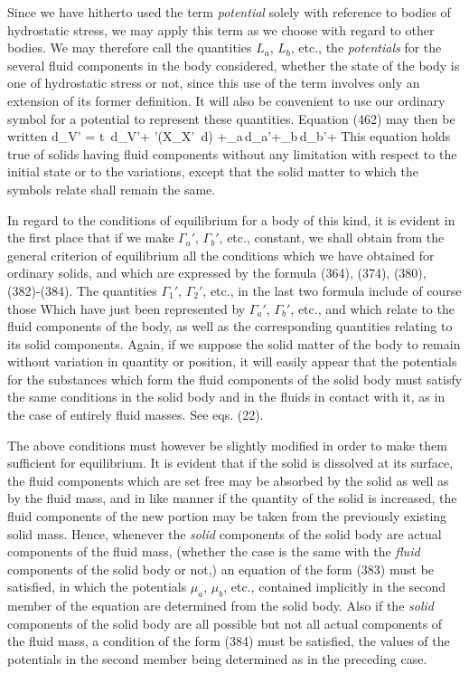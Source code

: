 \documentclass[12pt]{article}
\begin{document}
{Since we have hitherto used the term \textit{potential} solely with reference to bodies of hydrostatic stress, we may apply this term as we choose with regard to other bodies. We may therefore call the quantities $L_a$, $L_b$, etc., the \textit{potentials} for the several fluid components in the body considered, whether the state of the body is one of hydrostatic stress or not, since this use of the term involves only an extension of its former definition. It will also be convenient to use our ordinary symbol for a potential to represent these quantities. Equation (462) may then be written
\eqs d\epsilon_{V'} = t \,d\eta_{V'}+  \sum\sum\nolimits'\left(X_{X'} \,d\right) +\mu_a\,d\Gamma_a'+\mu_b\,d\Gamma_b'+     \label{468}\eqe
This equation holds true of solids having fluid components without any limitation with respect to the initial state or to the variations, except that the solid matter to which the symbols relate shall remain the same.


In regard to the conditions of equilibrium for a body of this kind, it is evident in the first place that if we make $\Gamma_a'$, $\Gamma_b'$, etc., constant, we shall obtain from the general criterion of equilibrium all the conditions which we have obtained for ordinary solids, and which are expressed by the formula (364), (374), (380), (382)-(384). The quantities $\Gamma_1'$, $\Gamma_2'$, etc., in the last two formula include of course those Which have just been represented by $\Gamma_a'$, $\Gamma_b'$, etc., and which relate to the fluid components of the body, as well as the corresponding quantities relating to its solid components. Again, if we suppose the solid matter of the body to remain without variation in quantity or position, it will easily appear that the potentials for the substances which form the fluid components of the solid body must satisfy the same conditions in the solid body and in the fluids in contact with it, as in the case of entirely fluid masses. See eqs. (22).


The above conditions must however be slightly modified in order to make them sufficient for equilibrium. It is evident that if the solid is dissolved at its surface, the fluid components which are set free may be absorbed by the solid as well as by the fluid mass, and in like manner if the quantity of the solid is increased, the fluid components of the new portion may be taken from the previously existing solid mass. Hence, whenever the \textit{solid} components of the solid body are actual components of the fluid mass, (whether the case is the same with the \textit{fluid} components of the solid body or not,) an equation of the form (383) must be satisfied, in which the potentials $\mu_a$, $\mu_b$, etc., contained implicitly in the second member of the equation are determined from the solid body. Also if the \textit{solid} components of the solid body are all possible but not all actual components of the fluid mass, a condition of the form (384) must be satisfied, the values of the potentials in the second member being determined as in the preceding case.


}
\end{document}
